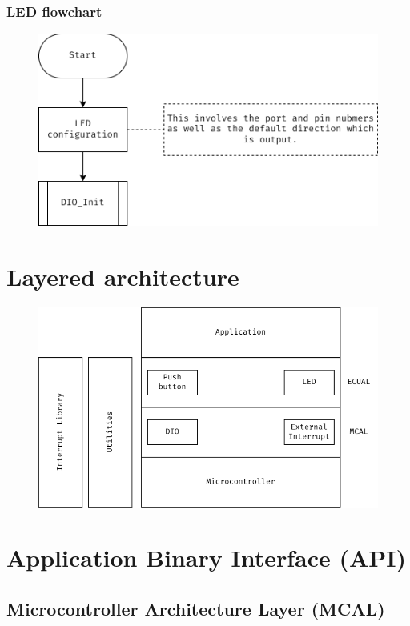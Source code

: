 \documentclass[10pt]{article}
\begin{document}
\subsubsection{LED flowchart}
\begin{figure}[H]
	\includegraphics[width=14cm]{led_init_flowchart}
	\centering
\end{figure}

\section{Layered architecture}

\begin{figure}[H]
	\includegraphics[width=14cm]{layered-arhictecture_v_2_0}
	\centering
\end{figure}

\section{Application Binary Interface (API)}
\subsection{Microcontroller Architecture Layer (MCAL)}
\end{document}
